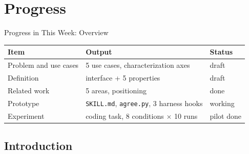 \documentclass[aspectratio=169,11pt]{beamer}
\begin{document}
\section{Progress}
\begin{frame}{Progress in This Week: Overview}
  \centering

  \vspace{0.8em}
  \footnotesize
  \begin{tabular}{lll}
    \toprule
    Item & Output & Status \\
    \midrule
    Problem and use cases & 5 use cases, characterization axes & draft \\
    Definition & interface + 5 properties & draft \\
    Related work & 5 areas, positioning & done \\
    Prototype & \texttt{SKILL.md}, \texttt{agree.py}, 3 harness hooks & working \\
    Experiment & coding task, 8 conditions $\times$ 10 runs & pilot done \\
    \bottomrule
  \end{tabular}
\end{frame}

\subsection{Introduction}
\end{document}
